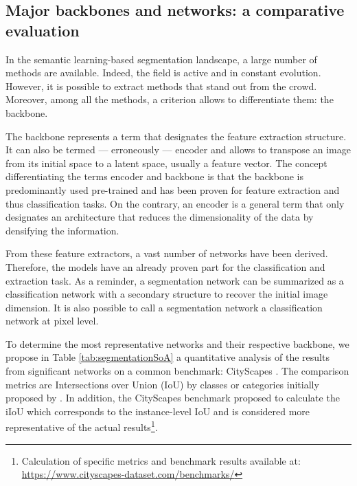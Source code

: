 \subsection{Major backbones and networks: a comparative evaluation}\label{seg1}

In the semantic learning-based segmentation landscape, a large number of methods are available. Indeed, the field is active and in constant evolution. However, it is possible to extract methods that stand out from the crowd. Moreover, among all the methods, a criterion allows to differentiate them: the backbone.


The backbone represents a term that designates the feature extraction structure. It can also be termed — erroneously — encoder and allows to transpose an image from its initial space to a latent space, usually a feature vector. The concept differentiating the terms encoder and backbone is that the backbone is predominantly used pre-trained and has been proven for feature extraction and thus classification tasks. On the contrary, an encoder is a general term that only designates an architecture that reduces the dimensionality of the data by densifying the information.

From these feature extractors, a vast number of networks have been derived. Therefore, the models have an already proven part for the classification and extraction task. As a reminder, a segmentation network can be summarized as a classification network with a secondary structure to recover the initial image dimension. It is also possible to call a segmentation network a classification network at pixel level.

To determine the most representative networks and their respective backbone, we propose in Table \ref{tab:segmentationSoA} a quantitative analysis of the results from significant networks on a common benchmark: CityScapes \cite{Cordts2016Cityscapes}. The comparison metrics are Intersections over Union (IoU) by classes or categories initially proposed by \cite{everingham2015pascal}. In addition, the CityScapes benchmark proposed to calculate the iIoU which corresponds to the instance-level IoU and is considered more representative of the actual results\footnote{Calculation of specific metrics and benchmark results available at: \url{https://www.cityscapes-dataset.com/benchmarks/}}.


